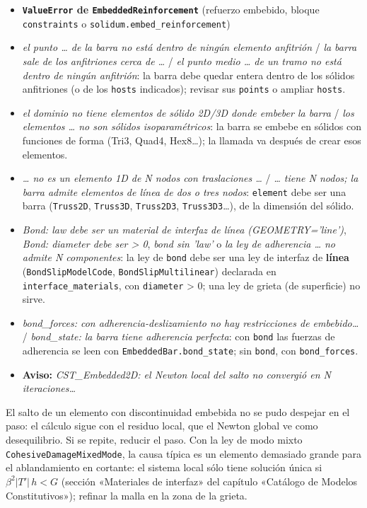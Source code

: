 \documentclass[11pt,oneside]{report}
\begin{document}
\begin{itemize}
  \item \textbf{\texttt{ValueError} de \texttt{EmbeddedReinforcement}} (refuerzo embebido, bloque \texttt{constraints} o \texttt{solidum.\allowbreak{}embed\_\allowbreak{}reinforcement})
  \item \textit{el punto \ldots{} de la barra no está dentro de ningún elemento anfitrión} / \textit{la barra sale de los anfitriones cerca de \ldots{}} / \textit{el punto medio \ldots{} de un tramo no está dentro de ningún anfitrión}: la barra debe quedar entera dentro de los sólidos anfitriones (o de los \texttt{hosts} indicados); revisar sus \texttt{points} o ampliar \texttt{hosts}.
  \item \textit{el dominio no tiene elementos de sólido 2D/3D donde embeber la barra} / \textit{los elementos \ldots{} no son sólidos isoparamétricos}: la barra se embebe en sólidos con funciones de forma (Tri3, Quad4, Hex8\ldots{}); la llamada va después de crear esos elementos.
  \item \textit{\ldots{} no es un elemento 1D de N nodos con traslaciones \ldots{}} / \textit{\ldots{} tiene N nodos; la barra admite elementos de línea de dos o tres nodos}: \texttt{element} debe ser una barra (\texttt{Truss2D}, \texttt{Truss3D}, \texttt{Truss2D3}, \texttt{Truss3D3}\ldots{}), de la dimensión del sólido.
  \item \textit{Bond: law debe ser un material de interfaz de línea (GEOMETRY='line')}, \textit{Bond: diameter debe ser \textgreater{} 0}, \textit{bond sin 'law'} o \textit{la ley de adherencia \ldots{} no admite N componentes}: la ley de \texttt{bond} debe ser una ley de interfaz de \textbf{línea} (\texttt{BondSlipModelCode}, \texttt{BondSlipMultilinear}) declarada en \texttt{interface\_\allowbreak{}materials}, con \texttt{diameter} \textgreater{} 0; una ley de grieta (de superficie) no sirve.
  \item \textit{bond\_forces: con adherencia-deslizamiento no hay restricciones de embebido\ldots{}} / \textit{bond\_state: la barra tiene adherencia perfecta}: con \texttt{bond} las fuerzas de adherencia se leen con \texttt{EmbeddedBar.\allowbreak{}bond\_\allowbreak{}state}; sin \texttt{bond}, con \texttt{bond\_forces}.
\end{itemize}

\begin{itemize}
  \item \textbf{Aviso:} \textit{CST\_Embedded2D: el Newton local del salto no convergió en N iteraciones\ldots{}}
\end{itemize}
  El salto de un elemento con discontinuidad embebida no se pudo despejar en el paso: el cálculo sigue con el residuo local, que el Newton global ve como desequilibrio. Si se repite, reducir el paso. Con la ley de modo mixto \texttt{CohesiveDamageMixedMode}, la causa típica es un elemento demasiado grande para el ablandamiento en cortante: el sistema local sólo tiene solución única si $\beta^2 |T'|\,h < G$ (sección «Materiales de interfaz» del capítulo «Catálogo de Modelos Constitutivos»); refinar la malla en la zona de la grieta.
\end{document}
